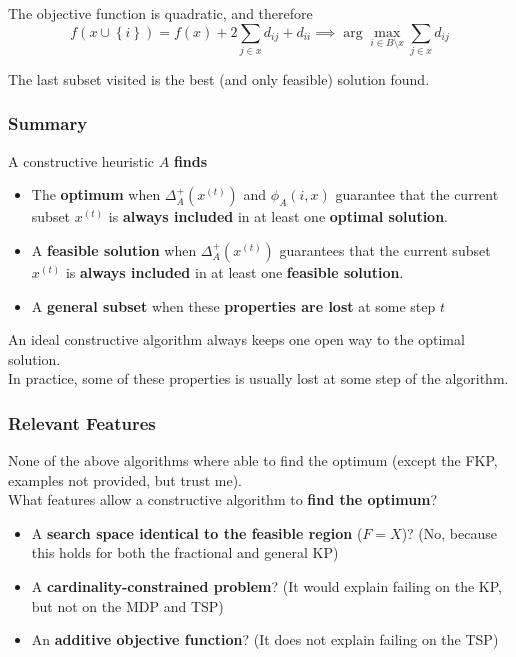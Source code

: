 The objective function is quadratic, and therefore
$$ f(x \cup \left\{i\right\}) = f(x) + 2 \sum_{j \in x} d_{ij} + d_{ii} \implies \arg \max_{i \in B \setminus x} \sum_{j \in x} d_{ij} $$

The last subset visited is the best (and only feasible) solution found.\\

\newpage

\subsubsection{Summary}
A constructive heuristic $A$ \textbf{finds}
\begin{itemize}
	\item The \textbf{optimum} when $\Delta_A^+ \left(x^{(t)}\right)$ and $\phi_A (i, x)$ guarantee that the current subset $x^{(t)}$ is \textbf{always included} in at least one \textbf{optimal solution}.\\
	
	\item A \textbf{feasible solution} when $\Delta_A^+ \left(x^{(t)}\right)$ guarantees that the current subset $x^{(t)}$ is \textbf{always included} in at least one \textbf{feasible solution}.\\
	
	\item A \textbf{general subset} when these \textbf{properties are lost} at some step $t$
\end{itemize}

An ideal constructive algorithm always keeps one open way to the optimal solution.\\

In practice, some of these properties is usually lost at some step of the algorithm.\\


\subsubsection{Relevant Features}
None of the above algorithms where able to find the optimum (except the FKP, examples not provided, but trust me).\\

What features allow a constructive algorithm to \textbf{find the optimum}? 
\begin{itemize}
	\item A \textbf{search space identical to the feasible region} ($F = X$)? (No, because this holds for both the fractional and general KP)
	\item A \textbf{cardinality-constrained problem}? (It would explain failing on the KP, but not on the MDP and TSP)
	\item An \textbf{additive objective function}? (It does not explain failing on the TSP)
\end{itemize}

